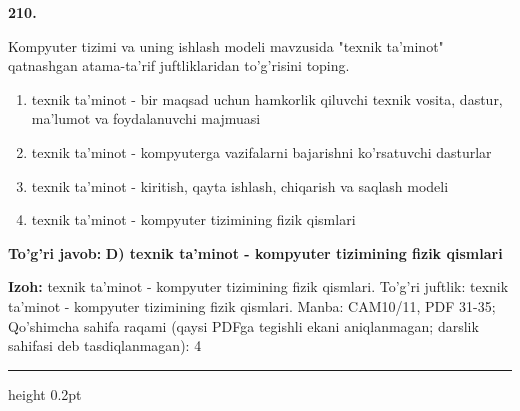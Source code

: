 \documentclass[10pt,a4paper]{article}
\begin{document}
{\bfseries\sffamily\color{ink} 210.}
\par
Kompyuter tizimi va uning ishlash modeli mavzusida "texnik ta'minot" qatnashgan atama-ta'rif juftliklaridan to'g'risini toping.
\begin{enumerate}[label=\Alph*),leftmargin=9mm]
\item texnik ta'minot - bir maqsad uchun hamkorlik qiluvchi texnik vosita, dastur, ma'lumot va foydalanuvchi majmuasi
\item texnik ta'minot - kompyuterga vazifalarni bajarishni ko'rsatuvchi dasturlar
\item texnik ta'minot - kiritish, qayta ishlash, chiqarish va saqlash modeli
\item texnik ta'minot - kompyuter tizimining fizik qismlari
\end{enumerate}
\begin{tcolorbox}[enhanced,breakable,colback=teal!4,colframe=teal!60!black,boxrule=0.45pt,arc=1.2mm,left=2.7mm,right=2.7mm,top=1.8mm,bottom=1.8mm,before skip=2mm,after skip=2mm]
{\bfseries\sffamily\color{teal}To'g'ri javob:} \textbf{D) texnik ta'minot - kompyuter tizimining fizik qismlari}
\par\smallskip
{\bfseries Izoh:} texnik ta'minot - kompyuter tizimining fizik qismlari. To'g'ri juftlik: texnik ta'minot - kompyuter tizimining fizik qismlari. Manba: CAM10/11, PDF 31-35; Qo'shimcha sahifa raqami (qaysi PDFga tegishli ekani aniqlanmagan; darslik sahifasi deb tasdiqlanmagan): 4
\end{tcolorbox}
\vspace{2mm}\hrule height 0.2pt\vspace{3mm}
\end{document}
